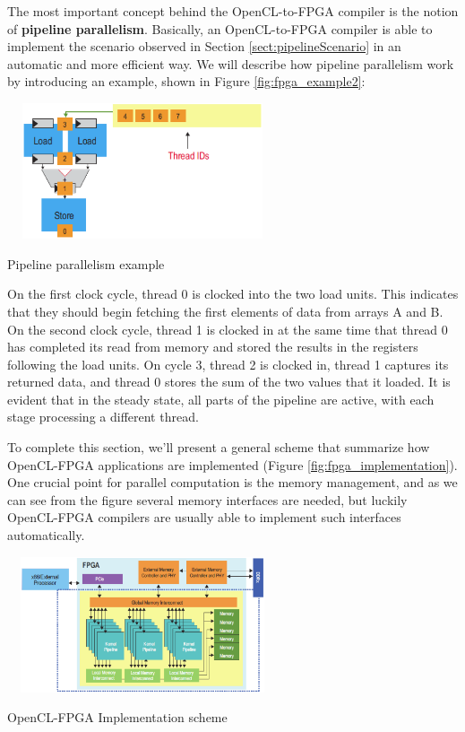 The most important concept behind the OpenCL-to-FPGA compiler is the notion of \textbf{pipeline parallelism}.
Basically, an OpenCL-to-FPGA compiler is able to implement the scenario observed in Section \ref{sect:pipelineScenario} in an automatic and more efficient way. We will describe how pipeline parallelism work by introducing an example, shown in Figure \ref{fig:fpga_example2}:

\begin{figurehere}
 \centering
 \includegraphics[width=8cm, height=4cm]{./eps/FPGA2.eps}
 \caption{Pipeline parallelism example}
 \label{fig:fpga_example2}
\end{figurehere}

On the first clock cycle, thread 0 is clocked into the two load units. This indicates that they should begin fetching the first elements of data from arrays A and B. On the second clock cycle, thread 1 is clocked in
at the same time that thread 0 has completed its read from memory and stored the results in the registers following the load units. On cycle 3, thread 2 is clocked in, thread 1 captures its returned data, and thread 0 stores the sum of the two values that it loaded. It is evident that in the steady state, all parts of the pipeline are active, with each stage processing a different thread.
	
To complete this section, we'll present a general scheme that summarize how OpenCL-FPGA applications are implemented (Figure \ref{fig:fpga_implementation}). One crucial point for parallel computation is the memory management, and as we can see from the figure several memory interfaces are needed, but luckily OpenCL-FPGA compilers are usually able to implement such interfaces automatically.

\begin{figurehere}
 \centering
 \includegraphics[width=8cm, height=4cm]{./eps/FPGA3.eps}
 \caption{OpenCL-FPGA Implementation scheme}
 \label{fig:fpga_implementation}
\end{figurehere}

